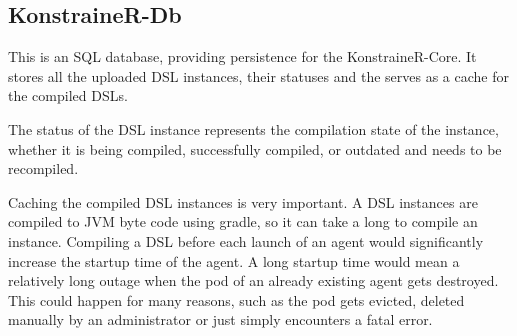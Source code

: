\subsection{KonstraineR-Db}

This is an SQL database, providing persistence for the KonstraineR-Core. It stores all the uploaded DSL instances, their statuses and the serves as a cache for the compiled DSLs.

The status of the DSL instance represents the compilation state of the instance, whether it is being compiled, successfully compiled, or outdated and needs to be recompiled.

Caching the compiled DSL instances is very important. A DSL instances are compiled to JVM byte code using gradle, so it can take a long to compile an instance. Compiling a DSL before each launch of an agent would significantly increase the startup time of the agent. A long startup time would mean a relatively long outage when the pod of an already existing agent gets destroyed. This could happen for many reasons, such as the pod gets evicted, deleted manually by an administrator or just simply encounters a fatal error.

